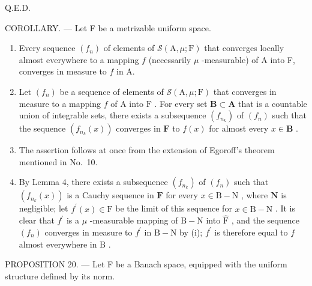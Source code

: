 Q.E.D.

COROLLARY. --- Let F be a metrizable uniform space.

\begin{enumerate}
\def\labelenumi{(\roman{enumi})}
\item
  Every sequence \((f_n)\) of elements of \(\mathcal{S}(\mathrm{A},\mu ;\mathrm{F})\) that converges locally almost everywhere to a mapping \(f\) (necessarily \(\mu\) -measurable) of A into F, converges in measure to \(f\) in A.
\item
  Let \((f_n)\) be a sequence of elements of \(\mathcal{S}(\mathrm{A},\mu ;\mathrm{F})\) that converges in measure to a mapping \(f\) of \(\mathrm{A}\) into \(\mathrm{F}\) . For every set \(\mathbf{B}\subset \mathbf{A}\) that is a countable union of integrable sets, there exists a subsequence \((f_{n_k})\) of \((f_n)\) such that the sequence \((f_{n_k}(x))\) converges in \(\mathbf{F}\) to \(f(x)\) for almost every \(x\in \mathbf{B}\) .
\setcounter{enumi}{0}
\item
  The assertion follows at once from the extension of Egoroff's theorem mentioned in No.~10.
\item
  By Lemma 4, there exists a subsequence \((f_{n_k})\) of \((f_n)\) such that \((f_{n_k}(x))\) is a Cauchy sequence in \(\mathbf{F}\) for every \(x\in \mathrm{B} - \mathrm{N}\) , where \(\mathbf{N}\) is negligible; let \(f^{\prime}(x)\in \widehat{\mathrm{F}}\) be the limit of this sequence for \(x\in \mathrm{B} - \mathrm{N}\) . It is clear that \(f^{\prime}\) is a \(\mu\) -measurable mapping of \(\mathrm{B} - \mathrm{N}\) into \(\widehat{\mathrm{F}}\) , and the sequence \((f_n)\) converges in measure to \(f^{\prime}\) in \(\mathrm{B} - \mathrm{N}\) by (i); \(f^{\prime}\) is therefore equal to \(f\) almost everywhere in \(\mathrm{B}\) .
\end{enumerate}

PROPOSITION 20. --- Let F be a Banach space, equipped with the uniform structure defined by its norm.

